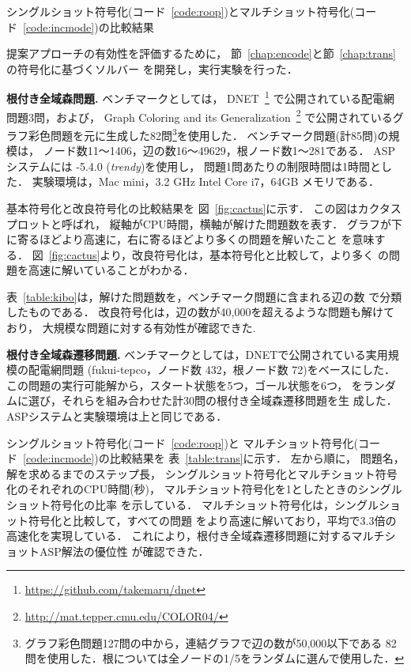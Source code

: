 \begin{table}[t]
  \centering
  \caption{シングルショット符号化(コード~\ref{code:roop})とマルチショット符号化(コード~\ref{code:incmode})の比較結果}
  \label{table:trans}
  
\end{table}

提案アプローチの有効性を評価するために，
節~\ref{chap:encode}と節~\ref{chap:trans}の符号化に基づくソルバー
を開発し，実行実験を行った．

\textbf{根付き全域森問題.}
ベンチマークとしては，
DNET~\footnote{\url{https://github.com/takemaru/dnet}}
で公開されている配電網問題3問，および，
Graph Coloring and its Generalization~\footnote{\url{http://mat.tepper.cmu.edu/COLOR04/}}
で公開されているグラフ彩色問題を元に生成した82問\footnote{%
グラフ彩色問題127問の中から，連結グラフで辺の数が50,000以下である
82問を使用した．根については全ノードの1/5をランダムに選んで使用した．
}を使用した．
ベンチマーク問題(計85問)の規模は，
ノード数11〜1406，辺の数16〜49629，根ノード数1〜281である．
%
ASPシステムには {\clingo}-5.4.0 (\textit{trendy})を使用し，
問題1問あたりの制限時間は1時間とした．
実験環境は，Mac mini，3.2 GHz Intel Core i7，64GB メモリである．

基本符号化と改良符号化の比較結果を
図~\ref{fig:cactus}に示す．
この図はカクタスプロットと呼ばれ，
縦軸がCPU時間，横軸が解けた問題数を表す．
グラフが下に寄るほどより高速に，右に寄るほどより多くの問題を解いたこと
を意味する．
図~\ref{fig:cactus}より，改良符号化は，基本符号化と比較して，より多く
の問題を高速に解いていることがわかる．

表~\ref{table:kibo}は，解けた問題数を，ベンチマーク問題に含まれる辺の数
で分類したものである．
改良符号化は，辺の数が40,000を超えるような問題も解けており，
大規模な問題に対する有効性が確認できた. 

\textbf{根付き全域森遷移問題.}
ベンチマークとしては，DNETで公開されている実用規模の配電網問題
({\sf fukui-tepco}，ノード数 432，根ノード数 72)をベースにした．
この問題の実行可能解から，スタート状態を5つ，ゴール状態を6つ，
をランダムに選び，それらを組み合わせた計30問の根付き全域森遷移問題を生
成した．ASPシステムと実験環境は上と同じである．

シングルショット符号化(コード~\ref{code:roop})と
マルチショット符号化(コード~\ref{code:incmode})の比較結果を
表~\ref{table:trans}に示す．
左から順に，
問題名，
解を求めるまでのステップ長，
シングルショット符号化とマルチショット符号化のそれぞれのCPU時間(秒)，
マルチショット符号化を1としたときのシングルショット符号化の比率
を示している．
マルチショット符号化は，シングルショット符号化と比較して，すべての問題
をより高速に解いており，平均で3.3倍の高速化を実現している．
これにより，根付き全域森遷移問題に対するマルチショットASP解法の優位性
が確認できた．

